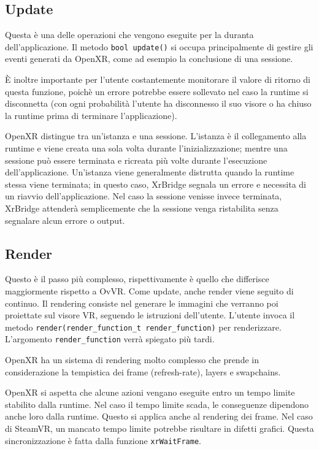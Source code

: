 \documentclass[twoside]{supsistudent}
\begin{document}
\subsection{Update}

Questa è una delle operazioni che vengono eseguite per la duranta dell'applicazione. Il metodo \texttt{bool update()} si occupa principalmente di gestire gli eventi generati da OpenXR, come ad esempio la conclusione di una sessione.

È inoltre importante per l'utente costantemente monitorare il valore di ritorno di questa funzione, poichè un errore potrebbe essere sollevato nel caso la runtime si disconnetta (con ogni probabilità l'utente ha disconnesso il suo visore o ha chiuso la runtime prima di terminare l'applicazione).

OpenXR distingue tra un'istanza e una sessione. L'istanza è il collegamento alla runtime e viene creata una sola volta durante l'inizializzazione; mentre una sessione può essere terminata e ricreata più volte durante l'esecuzione dell'applicazione. Un'istanza viene generalmente distrutta quando la runtime stessa viene terminata; in questo caso, XrBridge segnala un errore e necessita di un riavvio dell'applicazione. Nel caso la sessione venisse invece terminata, XrBridge attenderà semplicemente che la sessione venga ristabilita senza segnalare alcun errore o output.

\subsection{Render}

Questo è il passo più complesso, rispettivamente è quello che differisce maggiormente rispetto a OvVR. Come update, anche render viene seguito di continuo. Il rendering consiste nel generare le immagini che verranno poi proiettate sul visore VR, seguendo le istruzioni dell'utente. L'utente invoca il metodo \texttt{render(render\_function\_t render\_function)} per renderizzare. L'argomento \texttt{render\_function} verrà spiegato più tardi.

OpenXR ha un sistema di rendering molto complesso che prende in considerazione la tempistica dei frame (refresh-rate), layers e swapchains.

OpenXR si aspetta che alcune azioni vengano eseguite entro un tempo limite stabilito dalla runtime. Nel caso il tempo limite scada, le conseguenze dipendono anche loro dalla runtime. Questo si applica anche al rendering dei frame. Nel caso di SteamVR, un mancato tempo limite potrebbe risultare in difetti grafici. Questa sincronizzazione è fatta dalla funzione \texttt{xrWaitFrame}.
\end{document}

